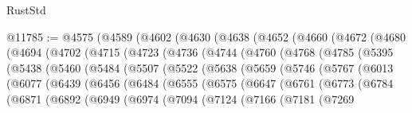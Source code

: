 \begin{lexlean}{RustStd}
\begin{coremodule}
@11785 := @4575
    (@4589
      (@4602
        (@4630
          (@4638
            (@4652
              (@4660
                (@4672
                  (@4680
                    (@4694
                      (@4702
                        (@4715
                          (@4723
                            (@4736
                              (@4744
                                (@4760
                                  (@4768
                                    (@4785
                                      (@5395
                                        (@5438
                                          (@5460
                                            (@5484
                                              (@5507
                                                (@5522
                                                  (@5638
                                                    (@5659
                                                      (@5746
                                                        (@5767
                                                          (@6013
                                                            (@6077
                                                              (@6439
                                                                (@6456
                                                                  (@6484
                                                                    (@6555
                                                                      (@6575
                                                                        (@6647
                                                                          (@6761
                                                                            (@6773
                                                                              (@6784
                                                                                (@6871
                                                                                  (@6892
                                                                                    (@6949
                                                                                      (@6974
                                                                                        (@7094
                                                                                          (@7124
                                                                                            (@7166
                                                                                              (@7181
                                                                                                (@7269

\end{coremodule}
\end{lexlean}
